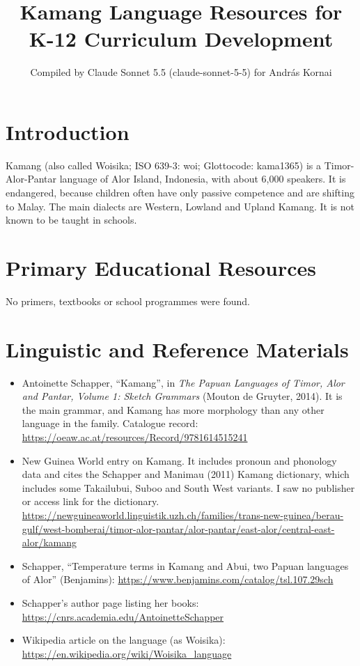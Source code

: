 \documentclass[12pt]{article}
\title{Kamang Language Resources for K-12 Curriculum Development}
\author{Compiled by Claude Sonnet 5.5 (claude-sonnet-5-5) for Andr\'as Kornai}
\date{}
\begin{document}
\maketitle

\section{Introduction}
Kamang (also called Woisika; ISO 639-3: woi; Glottocode: kama1365) is a Timor-Alor-Pantar language of Alor Island, Indonesia, with about 6,000 speakers. It is endangered, because children often have only passive competence and are shifting to Malay. The main dialects are Western, Lowland and Upland Kamang. It is not known to be taught in schools.

\section{Primary Educational Resources}
No primers, textbooks or school programmes were found.

\section{Linguistic and Reference Materials}
\begin{itemize}
\item Antoinette Schapper, ``Kamang'', in \emph{The Papuan Languages of Timor, Alor and Pantar, Volume 1: Sketch Grammars} (Mouton de Gruyter, 2014). It is the main grammar, and Kamang has more morphology than any other language in the family. Catalogue record: \url{https://oeaw.ac.at/resources/Record/9781614515241}
\item New Guinea World entry on Kamang. It includes pronoun and phonology data and cites the Schapper and Manimau (2011) Kamang dictionary, which includes some Takailubui, Suboo and South West variants. I saw no publisher or access link for the dictionary. \url{https://newguineaworld.linguistik.uzh.ch/families/trans-new-guinea/berau-gulf/west-bomberai/timor-alor-pantar/alor-pantar/east-alor/central-east-alor/kamang}
\item Schapper, ``Temperature terms in Kamang and Abui, two Papuan languages of Alor'' (Benjamins): \url{https://www.benjamins.com/catalog/tsl.107.29sch}
\item Schapper's author page listing her books: \url{https://cnrs.academia.edu/AntoinetteSchapper}
\item Wikipedia article on the language (as Woisika): \url{https://en.wikipedia.org/wiki/Woisika_language}
\end{itemize}
\end{document}
